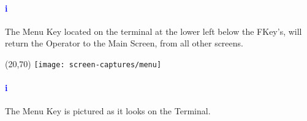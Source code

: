 \paragraph*{\textbf{\LARGE \textcolor{blue}{i}}}
The Menu Key located on the terminal at the lower left below the FKey's, will return the Operator to the Main Screen, from all other screens.\\
\begin{minipage}{4cm}
	\begin{picture}(20,70)
	\texttt{[image: screen-captures/menu]}
	\end{picture}
\end{minipage}\begin{minipage}[]{11cm}
	\paragraph{\textbf{\LARGE \textcolor{blue}{i}}} The Menu Key is pictured as it looks on the Terminal.
\end{minipage}
\pagebreak
\nopagebreak
